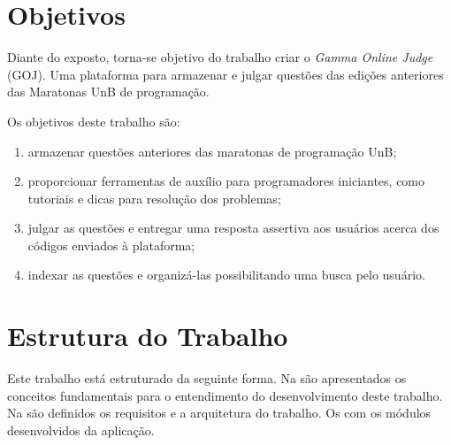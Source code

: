 \section{Objetivos}
\label{sec:objetivos}

Diante do exposto, torna-se objetivo do trabalho criar o \textit{Gamma Online Judge} (GOJ). Uma plataforma para armazenar e julgar questões das edições anteriores das Maratonas UnB de programação.

Os objetivos deste trabalho são: 
\begin{enumerate}
    \item armazenar questões anteriores das maratonas de programação UnB;
    \item proporcionar ferramentas de auxílio para programadores iniciantes, como tutoriais e dicas para resolução dos problemas;
    \item julgar as questões e entregar uma resposta assertiva aos usuários acerca dos códigos enviados à plataforma;
    \item indexar as questões e organizá-las possibilitando uma busca pelo usuário.
\end{enumerate}

\section{Estrutura do Trabalho}
\label{sec:estruturaDoTrabalho}

Este trabalho está estruturado da seguinte forma. Na  são apresentados os conceitos fundamentais para o entendimento do desenvolvimento deste trabalho. Na  são definidos os requisitos e a arquitetura do trabalho. Os  com os módulos desenvolvidos da aplicação.

